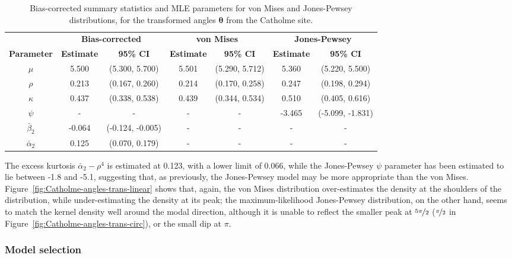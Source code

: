 \documentclass[../../ArchStats.tex]{subfiles}
\begin{document}
\begin{table}[!h]
\footnotesize
\centering
\caption{Bias-corrected summary statistics and MLE parameters for von Mises and Jones-Pewsey distributions, for the transformed angles $\boldsymbol{\theta}$ from the Catholme site. }
\label{tab:Catholme-statistics}
\begin{tabular}{c|cc|cc|cc}
\hline 
 & \multicolumn{2}{c|}{\textbf{Bias-corrected}} & \multicolumn{2}{c|}{\textbf{von Mises}} & \multicolumn{2}{c}{\textbf{Jones-Pewsey}} \\
\textbf{Parameter} & \textbf{Estimate} & \textbf{95\% CI} & \textbf{Estimate} & \textbf{95\% CI} & \textbf{Estimate} & \textbf{95\% CI} \\
\hline
$\mu$ & 5.500 & (5.300,  5.700) & 5.501 & (5.290, 5.712) & 5.360 & (5.220, 5.500) \\ 
$\rho$ & 0.213 & (0.167, 0.260) & 0.214 & (0.170, 0.258) &  0.247 & (0.198, 0.294) \\ 
$\kappa$ & 0.437 & (0.338, 0.538) & 0.439 & (0.344, 0.534) &  0.510 & (0.405, 0.616)\\ 
$\psi$ & - & - & - & - &  -3.465 & (-5.099, -1.831) \\ 
$\bar{\beta}_2$ & -0.064 & (-0.124, -0.005) & - & - & - & - \\ 
$\bar{\alpha}_2 $ & 0.125 & (0.070, 0.179) & - & - & - & - \\ 
\hline
\end{tabular}
\end{table}

The excess kurtosis $\bar{\alpha}_2 - \rho^4$ is estimated at 0.123, with a lower limit of 0.066, while the Jones-Pewsey $\psi$ parameter has been estimated to lie between -1.8 and -5.1, suggesting that, as previously, the Jones-Pewsey model may be more appropriate than the von Mises. Figure~\ref{fig:Catholme-angles-trans-linear} shows that, again, the von Mises distribution over-estimates the density at the shoulders of the distribution, while under-estimating the density at its peak; the maximum-likelihood Jones-Pewsey distribution, on the other hand, seems to match the kernel density well around the modal direction, although it is unable to reflect the smaller peak at $\nicefrac{5\pi}{2}$ ($\nicefrac{\pi}{2}$ in Figure~\ref{fig:Catholme-angles-trans-circ}), or the small dip at $\pi$.

\subsubsection{Model selection}
\end{document}
